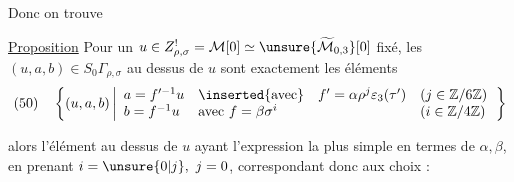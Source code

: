 Donc on trouve

\uline{Proposition}
Pour un \(u\in Z_{\rho,\sigma}^{!}=\mathcal M[0]
\simeq\unsure{\widetilde{\mathcal M}_{0,3}}[0]\) fixé,
les \((u,a,b)\in S_0\Gamma_{\rho,\sigma}\) au dessus de \(u\)
sont exactement les éléments 
\[
(50)\quad
\left\{(u,a,b)\left|\begin{array}{lll}
a=f'^{-1}u&\inserted{\text{avec}}\quad
 f'=\alpha\rho^j\varepsilon_3(\tau')&(j\in\mathbb Z/6\mathbb Z)\\
b=f^{-1}u&\text{avec }f=\beta\sigma^i&(i\in\mathbb Z/4\mathbb Z)
\end{array}\right.\right\}
\]

 alors l'élément
 au dessus de \(u\)
ayant l'expression la plus simple en termes de \(\alpha,\beta\),
en prenant \(i=\unsure{0|j},\ j=0\), correspondant donc aux choix :

